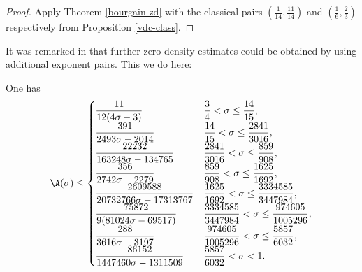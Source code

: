 \literature
{}

\begin{proof} Apply Theorem \ref{bourgain-zd} with the classical pairs $(\frac{1}{14},\frac{11}{14})$ and $(\frac{1}{6}, \frac{2}{3})$ respectively from Proposition \ref{vdc-class}.
\end{proof}

It was remarked in \cite{bourgain_remarks_1995} that further zero density estimates could be obtained by using additional exponent pairs.  This we do here:

\begin{corollary}\label{bourgain-zero-density-optimized} One has
\[
\A(\sigma) \leq \begin{cases}
\dfrac{11}{12(4 \sigma - 3)} & \dfrac{3}{4} < \sigma \le \dfrac{14}{15},\\
\dfrac{391}{2493 \sigma - 2014} & \dfrac{14}{15} < \sigma \le \dfrac{2841}{3016},\\
\dfrac{22232}{163248 \sigma - 134765} & \dfrac{2841}{3016} < \sigma \le \dfrac{859}{908},\\
\dfrac{356}{2742 \sigma - 2279} & \dfrac{859}{908} < \sigma \le \dfrac{1625}{1692},\\
\dfrac{2609588}{20732766\sigma - 17313767} & \dfrac{1625}{1692} < \sigma \le \dfrac{3334585}{3447984},\\
\dfrac{75872}{9 (81024 \sigma - 69517)} & \dfrac{3334585}{3447984} < \sigma \le \dfrac{974605}{1005296},\\
\dfrac{288}{3616 \sigma - 3197} & \dfrac{974605}{1005296} < \sigma \le \dfrac{5857}{6032},\\
\dfrac{86152}{1447460 \sigma - 1311509} & \dfrac{5857}{6032} < \sigma < 1.
\end{cases}
\]
\end{corollary}

